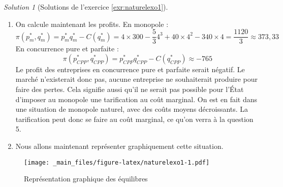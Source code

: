 \documentclass[
]{book}
\theoremstyle{definition}
\theoremstyle{definition}
\theoremstyle{definition}
\theoremstyle{definition}
\theoremstyle{remark}
\newtheorem*{solution}{Solution}
\begin{document}
\begin{solution}[Solutions de l'exercice \ref{exr:naturelexo1}]
\begin{enumerate}
  On doit donc résoudre une équation du second degré pour obtenir le résultat.
  On commence par calculer le discriminant :
  \[\Delta=(-6)^2+4\times32=36+128=164=4\times41\]
  On en déduit que :
  \[q^*=\frac{6\pm\sqrt{41}}{2}=3+\sqrt{41}\text{ ou } 3-\sqrt{41}\]
  La solution \(q^*=3-\sqrt{41}<0\) est impossible, car les quantités sont forcément positives.
  La seule solution est donc \(q^*_{CPP}=3+\sqrt{41}\approx\) 9.4.
  On peut en déduire \(p^*_{CPP}=50(7-\sqrt{41})\approx\) 29.84.
\item
  On calcule maintenant les profits.
  En monopole :
  \[\pi(p^*_m, q^*_m)=p^*_mq^*_m-C(q^*_m)=4\times300-\frac{5}{3}4^3+40\times4^2-340\times4=\frac{1120}{3}\approx 373,33\]
  En concurrence pure et parfaite :
  \[\pi(p^*_{CPP}, q^*_{CPP})=p^*_{CPP}q^*_{CPP}-C(q^*_{CPP})\approx-765\]
  Le profit des entreprises en concurrence pure et parfaite serait négatif.
  Le marché n'existerait donc pas, aucune entreprise ne souhaiterait produire pour faire des pertes.
  Cela signifie aussi qu'il ne serait pas possible pour l'État d'imposer au monopole une tarification au coût marginal.
  On est en fait dans une situation de monopole naturel, avec des coûts moyens décroissants.
  La tarification peut donc se faire au coût marginal, ce qu'on verra à la question 5.
\item
  Nous allons maintenant représenter graphiquement cette situation.
\end{enumerate}

\begin{figure}
\centering
\texttt{[image: \_main\_files/figure-latex/naturelexo1-1.pdf]}
\caption{\label{fig:naturelexo1}Représentation graphique des équilibres}
\end{figure}


\end{solution}
\end{document}

